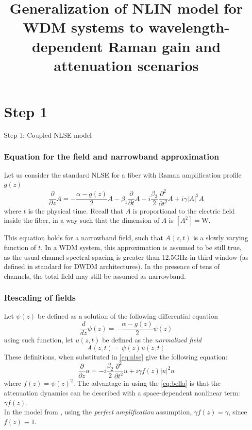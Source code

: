 \documentclass[8pt]{beamer} %
\title{\Huge{Generalization of NLIN model for WDM systems to wavelength-dependent Raman gain and attenuation scenarios}}
\date{}
\begin{document}
\begin{frame}
    \maketitle
\end{frame}
\section{Step 1}
\begin{frame}
    \Huge{Step 1: Coupled NLSE model}
\end{frame}

\begin{frame}
    \frametitle{Equation for the field and narrowband approximation}
    Let us consider the standard NLSE for a fiber with Raman amplification profile $g(z)$
    \begin{equation}\label{eq:nlse}
        \frac{\partial}{\partial z} A = -\frac{\alpha - g(z)}{2}A - \beta_1 \frac{\partial}{\partial t} A - i \frac{\beta_2}{2} \frac{\partial^2}{\partial t^2} A + i \gamma |A|^2 A
    \end{equation}
    where $t$ is the physical time. Recall that $A$ is proportional to the electric field inside the fiber, in a way such that the dimension of $A$ is $[A^2] = \text{W}$.

    This equation holds for a narrowband field, such that $A(z, t)$ is a slowly varying function of $t$.
    In a WDM system, this approximation is assumed to be still true, as the usual channel spectral spacing is greater than $12.5$GHz  in third window (as defined in standard \cite{ITU-T} for DWDM architectures). In the presence of tens of channels, the total field may still be assumed as narrowband.
\end{frame}

\begin{frame}
    \frametitle{Rescaling of fields}
    Let $\psi(z)$ be defined as a solution of the following differential equation
    \begin{equation}
        \frac{d}{dz}\psi(z) = -\frac{\alpha-g(z)}{2} \psi(z)
    \end{equation}
    using such function, let $u(z, t)$ be defined as the \textit{normalized field}
    \begin{equation}
        A(z, t) = \psi(z)u(z, t)
    \end{equation}
    These definitions, when substituted in \ref{eq:nlse} give the following equation:
    \begin{equation}\label{eq:bella}
        \frac{\partial}{\partial z} u = - i \frac{\beta_2}{2} \frac{\partial^2}{\partial t^2} u + i \gamma f(z) |u|^2 u
    \end{equation}
    where $f(z) = \psi(z)^2$. The advantage in using the \ref{eq:bella} is that the attenuation dynamics can be described with a space-dependent nonlinear term: $\gamma f(z)$. \\
    In the model from \cite{Dar_2013}, using the \textit{perfect amplification} assumption, $\gamma f(z) = \gamma$, since $f(z) \equiv 1$.
\end{frame}
\end{document}
